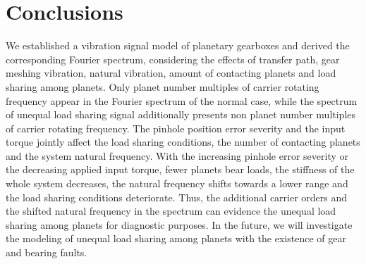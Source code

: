 \documentclass[a4paper,fleqn]{cas-sc}%
\begin{document}
\section{Conclusions \label{sec:conclusions}}
\par We established a vibration signal model of planetary gearboxes and derived the corresponding Fourier spectrum, considering the effects of transfer path, gear meshing vibration, natural vibration, amount of contacting planets and load sharing among planets. Only planet number multiples of carrier rotating frequency appear in the Fourier spectrum of the normal case, while the spectrum of unequal load sharing signal additionally presents non planet number multiples of carrier rotating frequency. The pinhole position error severity and the input torque jointly affect the load sharing conditions, the number of contacting planets and the system natural frequency. With the increasing pinhole error severity or the decreasing applied input torque, fewer planets bear loads, the stiffness of the whole system decreases, the natural frequency shifts towards a lower range and the load sharing conditions deteriorate. Thus, the additional carrier orders and the shifted natural frequency in the spectrum can evidence the unequal load sharing among planets for diagnostic purposes. In the future, we will investigate the modeling of unequal load sharing among planets with the existence of gear and bearing faults.
\end{document}
